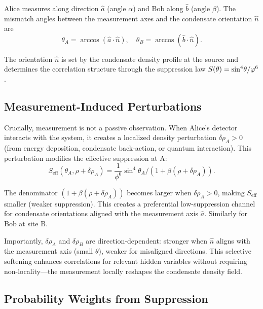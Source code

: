 Alice measures along direction $\hat{a}$ (angle $\alpha$) and Bob along $\hat{b}$ (angle $\beta$). The mismatch angles between the measurement axes and the condensate orientation $\hat{n}$ are
\begin{equation}
\theta_A = \arccos(\hat{a} \cdot \hat{n}), \quad \theta_B = \arccos(\hat{b} \cdot \hat{n}).
\label{P8:eq:mismatch_angles}
\end{equation}

The orientation $\hat{n}$ is set by the condensate density profile at the source and determines the correlation structure through the suppression law $S(\theta)=\sin^4\!\theta/\varphi^6$.

\subsection*{Measurement-Induced Perturbations}

Crucially, measurement is not a passive observation. When Alice's detector interacts with the system, it creates a localized density perturbation $\delta\rho_A > 0$ (from energy deposition, condensate back-action, or quantum interaction). This perturbation modifies the effective suppression at A:
\begin{equation}
S_{\mathrm{eff}}(\theta_A, \rho + \delta\rho_A) = \frac{1}{\phi^6} \sin^4\theta_A \Big/ (1 + \beta (\rho + \delta\rho_A)).
\label{P8:eq:seff_perturbed}
\end{equation}

The denominator $(1 + \beta(\rho + \delta\rho_A))$ becomes larger when $\delta\rho_A > 0$, making $S_{\mathrm{eff}}$ smaller (weaker suppression). This creates a preferential low-suppression channel for condensate orientations aligned with the measurement axis $\hat{a}$. Similarly for Bob at site B.

Importantly, $\delta\rho_A$ and $\delta\rho_B$ are direction-dependent: stronger when $\hat{n}$ aligns with the measurement axis (small $\theta$), weaker for misaligned directions. This selective softening enhances correlations for relevant hidden variables without requiring non-locality---the measurement locally reshapes the condensate density field.

\subsection*{Probability Weights from Suppression}

